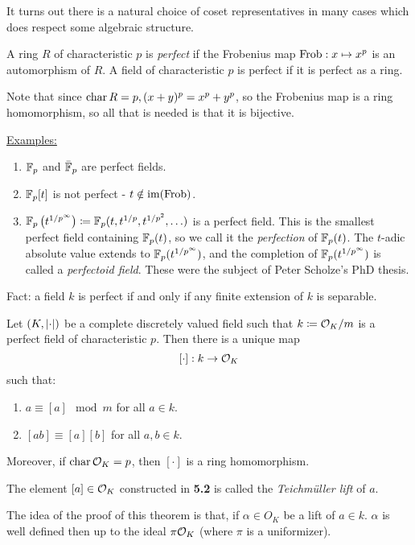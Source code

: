 \documentclass[10pt,a4paper]{article}
\begin{document}
It turns out there is a natural choice of coset representatives in many cases which does respect some algebraic structure.

\begin{definition}
  A ring $R$ of characteristic $p$ is \emph{perfect} if the Frobenius map $\operatorname{Frob}: x \mapsto x^p$ is an automorphism of $R$. A field of characteristic $p$ is perfect if it is perfect as a ring.
\end{definition}
Note that since $\operatorname{char} R = p, (x+y)^p = x^p + y^p$, so the Frobenius map is a ring homomorphism, so all that is needed is that it is bijective.

\underline{Examples:}
\begin{enumerate}
  \item $\mathbb{F}_p$ and $\bar{\mathbb{F}}_p$ are perfect fields.
  \item $\mathbb{F}_p[t]$ is not perfect - $t \notin \operatorname{im}(\operatorname{Frob})$.
  \item $\mathbb{F}_p\left(t^{1/p^\infty}\right) \coloneqq \mathbb{F}_p(t, t^{1/p}, t^{1/p^2}, \ldots)$ is a perfect field. This is the smallest perfect field containing $\mathbb{F}_p(t)$, so we call it the \emph{perfection} of $\mathbb{F}_p(t)$. The $t$-adic absolute value extends to $\mathbb{F}_p(t^{1/p^\infty})$, and the completion of $\mathbb{F}_p(t^{1/p^\infty})$ is called a \emph{perfectoid field}. These were the subject of Peter Scholze's PhD thesis.
\end{enumerate}
Fact: a field $k$ is perfect if and only if any finite extension of $k$ is separable.

\begin{theorem}
  Let $(K, \lvert\cdot\rvert)$ be a complete discretely valued field such that $k \coloneqq \mathcal{O}_K/m$ is a perfect field of characteristic $p$. Then there is a unique map \[ [\cdot]:k \to \mathcal{O}_K\] such that:
  \begin{enumerate}
    \item $a \equiv [a] \mod m$ for all $a \in k$.
    \item $[ab] \equiv [a][b]$ for all $a, b \in k$.
  \end{enumerate}
  Moreover, if $\operatorname{char} \mathcal{O}_K = p$, then $[\cdot]$ is a ring homomorphism.
\end{theorem}
\begin{definition}
  The element $[a] \in \mathcal{O}_K$ constructed in \textbf{5.2} is called the \emph{Teichm\"uller lift} of $a$.
\end{definition}
The idea of the proof of this theorem is that, if $\alpha \in O_K$ be a lift of $a \in k$. $\alpha$ is well defined then up to the ideal $\pi\mathcal{O}_K$ (where $\pi$ is a uniformizer).
\end{document}
